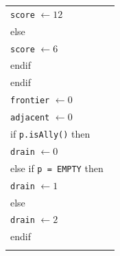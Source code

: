 \documentclass{article}
\newenvironment{pseudobox}
{
\centering
\begin{longtable}{|p{0.94\linewidth}|}
\hline
}
{
\\ \hline
\end{longtable}
\vspace{0.05cm}
}
\begin{document}
\begin{enumerate}[label=\alph*.]
\begin{enumerate}[label=\alph*.]
\begin{pseudobox}
\hspace*{4.5em}\texttt{score} $\leftarrow 12$ \\
\hspace*{3em}else \\
\hspace*{4.5em}\texttt{score} $\leftarrow 6$ \\
\hspace*{3em}endif \\
\hspace*{1.5em}endif \\

\hspace*{1.5em}\texttt{frontier} $\leftarrow 0$ \\
\hspace*{1.5em}\texttt{adjacent} $\leftarrow 0$ \\
\hspace*{1.5em}if \texttt{p.isAlly()} then \\
\hspace*{3em}\texttt{drain} $\leftarrow 0$ \\
\hspace*{1.5em}else if \texttt{p = EMPTY} then \\
\hspace*{3em}\texttt{drain} $\leftarrow 1$ \\
\hspace*{1.5em}else \\
\hspace*{3em}\texttt{drain} $\leftarrow 2$ \\
\hspace*{1.5em}endif \\


\end{pseudobox}
\end{enumerate}
\end{enumerate}
\end{document}
